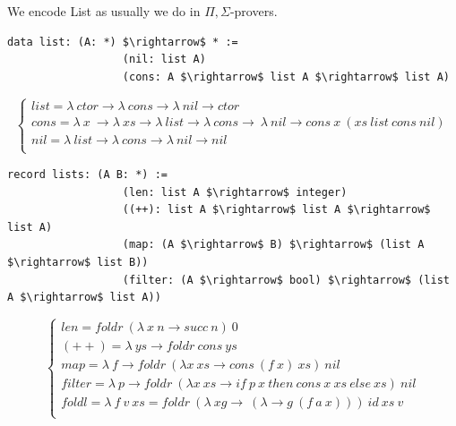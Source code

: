 \documentclass[11pt,oneside]{article}
\begin{document}
  We encode List as usually we do in $\Pi,\Sigma$-provers.

\begin{lstlisting}[mathescape=true]
             data list: (A: *) $\rightarrow$ * :=
                  (nil: list A)
                  (cons: A $\rightarrow$ list A $\rightarrow$ list A)
\end{lstlisting}

$$
\begin{cases}
list = \lambda\ ctor \rightarrow \lambda\ cons \rightarrow \lambda\ nil \rightarrow ctor\\
cons = \lambda\ x\ \rightarrow \lambda\ xs \rightarrow \lambda\ list \rightarrow \lambda\ cons \rightarrow\ \lambda\ nil \rightarrow cons\ x\ (xs\ list\ cons\ nil)\\
nil = \lambda\ list \rightarrow \lambda\ cons \rightarrow \lambda\ nil \rightarrow nil\\
\end{cases}
$$

\begin{lstlisting}[mathescape=true]
           record lists: (A B: *) :=
                  (len: list A $\rightarrow$ integer)
                  ((++): list A $\rightarrow$ list A $\rightarrow$ list A)
                  (map: (A $\rightarrow$ B) $\rightarrow$ (list A $\rightarrow$ list B))
                  (filter: (A $\rightarrow$ bool) $\rightarrow$ (list A $\rightarrow$ list A))
\end{lstlisting}
$$
\begin{cases}
len = foldr\ (\lambda\ x\ n \rightarrow succ\ n)\ 0\\
(++) = \lambda\ ys \rightarrow foldr\ cons\ ys\\
map = \lambda\ f \rightarrow foldr\ (\lambda x\ xs \rightarrow cons\ (f\ x)\ xs)\ nil\\
filter = \lambda\ p \rightarrow foldr\ (\lambda x\ xs \rightarrow if\ p\ x\ then\ cons\ x\ xs\ else\ xs)\ nil\\
foldl = \lambda\ f\ v\ xs = foldr\ (\lambda\ xg\rightarrow\ (\lambda \rightarrow g\ (f\ a\ x)))\ id\ xs\ v\\
\end{cases}
$$


\end{document}
